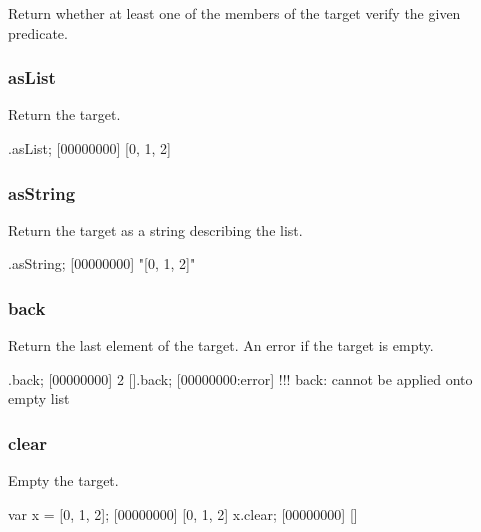 Return whether at least one of the members of the target verify the
given predicate.


\subsubsection{asList}

Return the target.

\begin{urbiscript}[firstnumber=last]
[0, 1, 2].asList;
[00000000] [0, 1, 2]
\end{urbiscript}

\subsubsection{asString}

Return the target as a string describing the list.

\begin{urbiscript}[firstnumber=last]
[0, 1, 2].asString;
[00000000] "[0, 1, 2]"
\end{urbiscript}

\subsubsection{back}

Return the last element of the target. An error if the target is empty.

\begin{urbiscript}[firstnumber=last]
[0, 1, 2].back;
[00000000] 2
[].back;
[00000000:error] !!! back: cannot be applied onto empty list
\end{urbiscript}

\subsubsection{clear}

Empty the target.

\begin{urbiscript}[firstnumber=last]
var x = [0, 1, 2];
[00000000] [0, 1, 2]
x.clear;
[00000000] []
\end{urbiscript}

